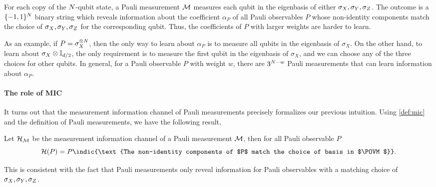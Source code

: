 For each copy of the ${N}$-qubit state, a Pauli measurement $\mathcal{M}$ measures each qubit in the eigenbasis of either ${\sigma_X},{\sigma_Y},{\sigma_Z}$. The outcome is a $\{-1, 1\}^{{N}}$ binary string which reveals information about the coefficient $\alpha_P$ of all Pauli observables $P$ whose non-identity components match the choice of ${\sigma_X},{\sigma_Y},{\sigma_Z}$ for the corresponding qubit. Thus, the coefficients of $P$ with larger weights are harder to learn. 

As an example, if $P=\sigma_X^{\otimes {N}}$, then the only way to learn about $\alpha_P$ is to measure all qubits in the eigenbasis of $\sigma_X$. On the other hand, to learn about $\sigma_X\otimes \mathbb{I}_{d/2}$, the only requirement is to measure the first qubit in the eigenbasis of $\sigma_X$, and we can choose any of the three choices for other qubits. In general, for a Pauli observable $P$ with weight $w$, there are $3^{{N}-w}$ Pauli measurements that can learn information about $\alpha_P$.

\paragraph{The role of MIC} It turns out that the measurement information channel of Pauli measurements precisely formalizes our previous intuition. Using \cref{def:mic} and the definition of Pauli measurements, we have the following result,
\begin{lemma}
\label{lem:mic-pauli-informal}
    Let $\mathcal{H}_{\mathcal{M}}$ be the measurement information channel of a Pauli measurement $\mathcal{M}$, then for all Pauli observable $P$
    \[
    \Luders(P)=P\indic{\text{The non-identity components of $P$ match the choice of basis in $\POVM$}}.
    \]
\end{lemma}
This is consistent with the fact that Pauli measurements only reveal information for Pauli observables with a matching choice of ${\sigma_X}, {\sigma_Y}, {\sigma_Z}$. 

